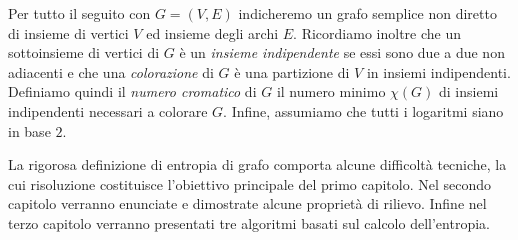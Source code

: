 Per tutto il seguito con $G=(V,E)$ indicheremo un grafo semplice non diretto di insieme di vertici $V$ ed insieme degli archi $E$. Ricordiamo inoltre che un sottoinsieme di vertici di $G$ è un \emph{insieme indipendente} se essi sono due a due non adiacenti e che una \emph{colorazione} di $G$ è una partizione di $V$ in insiemi indipendenti. Definiamo quindi il \emph{numero cromatico} di $G$ il numero minimo $\chi(G)$ di insiemi indipendenti necessari a colorare $G$. Infine, assumiamo che tutti i logaritmi siano in base $2$.

La rigorosa definizione di entropia di grafo comporta alcune difficoltà tecniche, la cui risoluzione costituisce l'obiettivo principale del primo capitolo. Nel secondo capitolo verranno enunciate e dimostrate alcune proprietà di rilievo. Infine nel terzo capitolo verranno presentati tre algoritmi basati sul calcolo dell'entropia.
